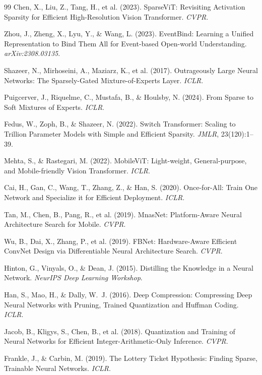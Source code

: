 \documentclass{article}
\begin{document}
{\begin{thebibliography}{99}
Chen, X., Liu, Z., Tang, H., et al. (2023). SparseViT: Revisiting Activation Sparsity for Efficient High-Resolution Vision Transformer. \emph{CVPR}.

Zhou, J., Zheng, X., Lyu, Y., \& Wang, L. (2023). EventBind: Learning a Unified Representation to Bind Them All for Event-based Open-world Understanding. \emph{arXiv:2308.03135}.

Shazeer, N., Mirhoseini, A., Maziarz, K., et al. (2017). Outrageously Large Neural Networks: The Sparsely-Gated Mixture-of-Experts Layer. \emph{ICLR}.

Puigcerver, J., Riquelme, C., Mustafa, B., \& Houlsby, N. (2024). From Sparse to Soft Mixtures of Experts. \emph{ICLR}.

Fedus, W., Zoph, B., \& Shazeer, N. (2022). Switch Transformer: Scaling to Trillion Parameter Models with Simple and Efficient Sparsity. \emph{JMLR}, 23(120):1--39.

Mehta, S., \& Rastegari, M. (2022). MobileViT: Light-weight, General-purpose, and Mobile-friendly Vision Transformer. \emph{ICLR}.

Cai, H., Gan, C., Wang, T., Zhang, Z., \& Han, S. (2020). Once-for-All: Train One Network and Specialize it for Efficient Deployment. \emph{ICLR}.

Tan, M., Chen, B., Pang, R., et al. (2019). MnasNet: Platform-Aware Neural Architecture Search for Mobile. \emph{CVPR}.

Wu, B., Dai, X., Zhang, P., et al. (2019). FBNet: Hardware-Aware Efficient ConvNet Design via Differentiable Neural Architecture Search. \emph{CVPR}.

Hinton, G., Vinyals, O., \& Dean, J. (2015). Distilling the Knowledge in a Neural Network. \emph{NeurIPS Deep Learning Workshop}.

Han, S., Mao, H., \& Dally, W.~J. (2016). Deep Compression: Compressing Deep Neural Networks with Pruning, Trained Quantization and Huffman Coding. \emph{ICLR}.

Jacob, B., Kligys, S., Chen, B., et al. (2018). Quantization and Training of Neural Networks for Efficient Integer-Arithmetic-Only Inference. \emph{CVPR}.

Frankle, J., \& Carbin, M. (2019). The Lottery Ticket Hypothesis: Finding Sparse, Trainable Neural Networks. \emph{ICLR}.


\end{thebibliography}}
\end{document}
